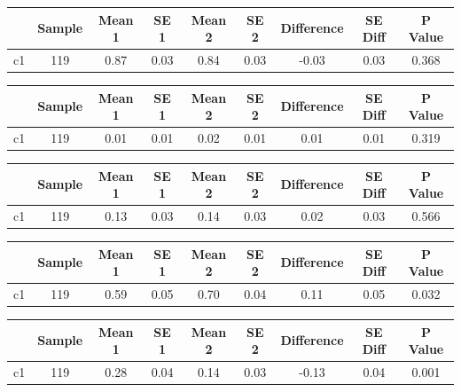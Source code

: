 {
\def\sym#1{\ifmmode^{#1}\else\(^{#1}\)\fi}
\begin{tabular}{l*{1}{cccccccc}}
\hline\hline
            &      Sample&      Mean 1&        SE 1&      Mean 2&        SE 2&  Difference&     SE Diff&     P Value\\
\hline
c1          &         119&        0.87&        0.03&        0.84&        0.03&       -0.03&        0.03&       0.368\\
\hline\hline
\end{tabular}
}
{
\def\sym#1{\ifmmode^{#1}\else\(^{#1}\)\fi}
\begin{tabular}{l*{1}{cccccccc}}
\hline\hline
            &      Sample&      Mean 1&        SE 1&      Mean 2&        SE 2&  Difference&     SE Diff&     P Value\\
\hline
c1          &         119&        0.01&        0.01&        0.02&        0.01&        0.01&        0.01&       0.319\\
\hline\hline
\end{tabular}
}
{
\def\sym#1{\ifmmode^{#1}\else\(^{#1}\)\fi}
\begin{tabular}{l*{1}{cccccccc}}
\hline\hline
            &      Sample&      Mean 1&        SE 1&      Mean 2&        SE 2&  Difference&     SE Diff&     P Value\\
\hline
c1          &         119&        0.13&        0.03&        0.14&        0.03&        0.02&        0.03&       0.566\\
\hline\hline
\end{tabular}
}
{
\def\sym#1{\ifmmode^{#1}\else\(^{#1}\)\fi}
\begin{tabular}{l*{1}{cccccccc}}
\hline\hline
            &      Sample&      Mean 1&        SE 1&      Mean 2&        SE 2&  Difference&     SE Diff&     P Value\\
\hline
c1          &         119&        0.59&        0.05&        0.70&        0.04&        0.11&        0.05&       0.032\\
\hline\hline
\end{tabular}
}
{
\def\sym#1{\ifmmode^{#1}\else\(^{#1}\)\fi}
\begin{tabular}{l*{1}{cccccccc}}
\hline\hline
            &      Sample&      Mean 1&        SE 1&      Mean 2&        SE 2&  Difference&     SE Diff&     P Value\\
\hline
c1          &         119&        0.28&        0.04&        0.14&        0.03&       -0.13&        0.04&       0.001\\
\hline\hline
\end{tabular}
}
